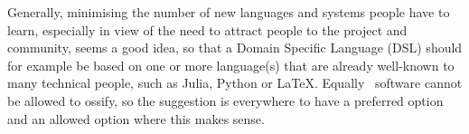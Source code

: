 Generally, minimising the number of new languages and systems people have to learn, especially
in view of the need to attract people to the project and community, seems a good idea, so that
a Domain Specific Language (DSL) should for
example be based on one or more language(s) that are already well-known to many technical people,
such as Julia, Python or \LaTeX.
Equally \nep \ software cannot be allowed to ossify, so the suggestion 
is everywhere to have a preferred option and an allowed option where this makes sense.
